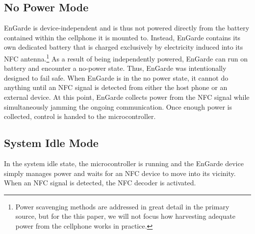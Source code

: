 \documentclass{sig-alternate}
\begin{document}
\subsection{No Power Mode}

EnGarde is device-independent and is thus not powered directly from the battery contained within the cellphone it is mounted to. Instead, EnGarde contains its own dedicated battery that is charged exclusively by electricity induced into its NFC antenna.\footnote{Power scavenging methods are addressed in great detail in the primary source, but for the this paper, we will not focus how harvesting adequate power from the cellphone works in practice.} 
As a result of being independently powered, EnGarde can run on battery and encounter a no-power state. Thus, EnGarde was intentionally designed to fail safe. When EnGarde is in the no power state, it cannot do anything until an NFC signal is detected from either the host phone or an external device. At this point, EnGarde collects power from the NFC signal while simultaneously jamming the ongoing communication. Once enough power is collected, control is handed to the microcontroller.

\subsection{System Idle Mode}
In the system idle state, the microcontroller is running and the EnGarde device simply manages power and waits for an NFC device to move into its vicinity. When an NFC signal is detected, the NFC decoder is activated.
\end{document}
